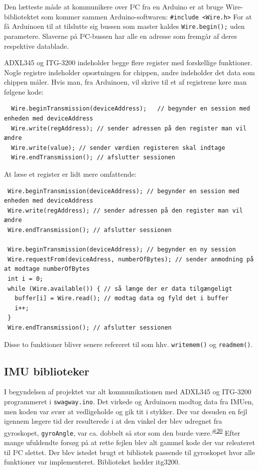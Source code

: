 \documentclass[a4paper,oneside,article,danish,table]{memoir}
\newcommand{\issue}[1]{\textsuperscript{\textcolor{blue!80!black}{\href{https://github.com/neic/Swagway/issues/#1}{\##1}}}}
\begin{document}
Den lætteste måde at kommunikere over I²C fra en Arduino er at bruge Wire-bibliotektet som kommer sammen Arduino-softwaren: \lstinline{#include <Wire.h>} For at få Arduinoen til at tilslutte sig bussen som master kaldes \lstinline{Wire.begin();} uden parametere. Slaverne på I²C-bussen har alle en adresse som fremgår af deres respektive datablade.

ADXL345 og ITG-3200 indeholder begge flere register med forskellige funktioner. Nogle registre indeholder opsætningen for chippen, andre indeholder det data som chippen måler. Hvis man, fra Arduinoen, vil skrive til et af registrene køre man følgene kode:
\begin{lstlisting}
  Wire.beginTransmission(deviceAddress);   // begynder en session med enheden med deviceAddress
  Wire.write(regAddress); // sender adressen på den register man vil ændre
  Wire.write(value); // sender værdien registeren skal indtage
  Wire.endTransmission(); // afslutter sessionen
\end{lstlisting}

At læse et register er lidt mere omfattende:
\begin{lstlisting}
 Wire.beginTransmission(deviceAddress); // begynder en session med enheden med deviceAddress
 Wire.write(regAddress); // sender adressen på den register man vil ændre
 Wire.endTransmission(); // afslutter sessionen
  
 Wire.beginTransmission(deviceAddress); // begynder en ny session
 Wire.requestFrom(deviceAdress, numberOfBytes); // sender anmodning på at modtage numberOfBytes
 int i = 0; 
 while (Wire.available()) { // så længe der er data tilgængeligt
   buffer[i] = Wire.read(); // modtag data og fyld det i buffer
   i++;
 }
 Wire.endTransmission(); // afslutter sessionen
\end{lstlisting}

Disse to funktioner bliver senere refereret til som hhv. \lstinline{writemem()} og \lstinline{readmem()}.


\subsection{IMU biblioteker}
I begyndelsen af projektet var alt kommunikationen med ADXL345 og ITG-3200 programmeret i \texttt{swagway.ino}. Det virkede og Arduinoen modtog data fra IMUen, men koden var svær at vedligeholde og gik tit i stykker. Der var desuden en fejl igennem lægere tid der resulterede i at den vinkel der blev udregnet fra gyroskopet, \lstinline{gyroAngle}, var ca. dobbelt så stor som den burde være.\issue{20} Efter mange ufuldendte forsøg på at rette fejlen blev alt gammel kode der var releateret til I²C slettet. Der blev istedet brugt et bibliotek passende til gyroskopet hvor alle funktioner var implementeret. Biblioteket hedder itg3200.
\end{document}
